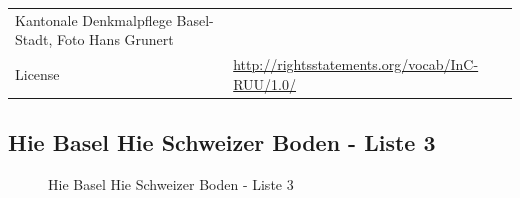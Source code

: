 \documentclass[
  letterpaper,
  DIV=11,
  numbers=noendperiod,
  landscape,
  a4paper,
  geometry:margin=1in]{scrartcl}
\begin{document}
\begin{longtable}[]{@{}
  >{\raggedright\arraybackslash}p{}
  >{\raggedright\arraybackslash}p{}@{}}
Kantonale Denkmalpflege Basel-Stadt, Foto Hans Grunert \\
License & \url{http://rightsstatements.org/vocab/InC-RUU/1.0/}
\textbar{} \\
\end{longtable}

\subsection{Hie Basel Hie Schweizer Boden - Liste
3}\label{hie-basel-hie-schweizer-boden---liste-3}

\begin{figure}


\caption{\label{fig-hie-basel-hie-schweizer-boden-liste-3}Hie Basel Hie
Schweizer Boden - Liste 3}

\end{figure}%
\end{document}
